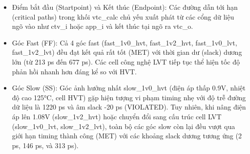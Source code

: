 \documentclass[12pt,a4paper,oneside]{book}
\begin{document}
\begin{itemize}
    \item Điểm bắt đầu (Startpoint) và Kết thúc (Endpoint): Các đường dẫn tới hạn (critical paths) trong khối vtc\_calc chủ yếu xuất phát từ các cổng dữ liệu ngõ vào như ctv\_i hoặc app\_i và kết thúc tại ngõ ra vtc\_o.
    \item Góc Fast (FF): Cả 4 góc fast (fast\_1v0\_hvt, fast\_1v2\_hvt, fast\_1v0\_lvt, fast\_1v2\_lvt) đều đạt kết quả rất tốt (MET) với thời gian dư (slack) dương lớn (từ 213 ps đến 677 ps). Các cell công nghệ LVT tiếp tục thể hiện tốc độ phản hồi nhanh hơn đáng kể so với HVT.
    \item Góc Slow (SS): Góc ảnh hưởng nhất slow\_1v0\_hvt (điện áp thấp 0.9V, nhiệt độ cao 125°C, cell HVT) gặp hiện tượng vi phạm timing nhẹ với độ trễ đường dữ liệu là 1220 ps và âm slack -20 ps (VIOLATED). Tuy nhiên, khi nâng điện áp lên 1.08V (slow\_1v2\_hvt) hoặc chuyển đổi sang cấu trúc cell LVT (slow\_1v0\_lvt, slow\_1v2\_lvt), toàn bộ các góc slow còn lại đều vượt qua giới hạn timing thành công (MET) với các khoảng slack dương tương ứng (2 ps, 146 ps, và 313 ps).
\end{itemize}
\newpage
\end{document}
